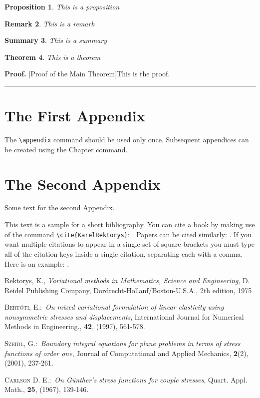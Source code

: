 \documentclass[letterpaper,12pt,openany,reqno]{book}%
\newtheorem{theorem}{Theorem}
\newtheorem{proposition}[theorem]{Proposition}
\newtheorem{remark}[theorem]{Remark}
\newtheorem{summary}[theorem]{Summary}
\newenvironment{proof}[1][Proof]{\textbf{#1.} }{\ \rule{0.5em}{0.5em}}
\begin{document}
\begin{proposition}
This is a proposition
\end{proposition}

\begin{remark}
This is a remark
\end{remark}

\begin{summary}
This is a summary
\end{summary}

\begin{theorem}
This is a theorem
\end{theorem}

\begin{proof}
[Proof of the Main Theorem]This is the proof.
\end{proof}

\appendix

\chapter{The First Appendix}

The \verb"\appendix" command should be used only once. Subsequent appendices can
be created using the Chapter command.

\chapter{The Second Appendix}

Some text for the second Appendix.

This text is a sample for a short bibliography. You can cite a book by making use of
the command \verb"\cite{KarelRektorys}": \cite{KarelRektorys}. Papers can be cited
similarly: \cite{Bertoti97}. If you want multiple citations to appear in a single set
of square brackets you must type all of the citation keys inside a single citation,
separating each with a comma. Here is an example: \cite{Bertoti97, Szeidl2001,
Carlson67}.

\begin{thebibliography}{9}
Rektorys, K., \textit{Variational methods in Mathematics,
Science and Engineering}, D. Reidel Publishing Company,
Dordrecht-Hollanf/Boston-U.S.A., 2th edition, 1975

 \textsc{Bert\'{o}ti, E.}:\ \textit{On mixed variational formulation
of linear elasticity using nonsymmetric stresses and displacements}, International
Journal for Numerical Methods in Engineering., \textbf{42}, (1997), 561-578.

 \textsc{Szeidl, G.}:\ \textit{Boundary integral equations for
plane problems in terms of stress functions of order one}, Journal of Computational and
Applied Mechanics, \textbf{2}(2), (2001), 237-261.

  \textsc{Carlson D. E.}:\ \textit{On G\"{u}nther's stress functions
for couple stresses}, Quart. Appl. Math., \textbf{25}, (1967), 139-146.
\end{thebibliography}
\end{document}
